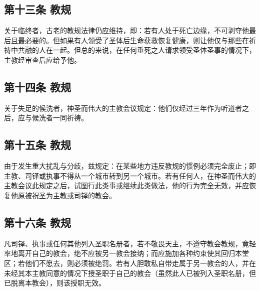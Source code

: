 
\subsection{第十三条 教规}

关于临终者，古老的教规法律仍应维持，即：若有人处于死亡边缘，不可剥夺他最后且最必要的。但如果有人领受了圣体后生命获救恢复健康，则让他仅与那些在祈祷中共融的人在一起。但总的来说，在任何垂死之人请求领受圣体圣事的情况下，主教经审查后应给予他。\par


\subsection{第十四条 教规}

关于失足的候洗者，神圣而伟大的主教会议规定：他们仅经过三年作为听道者之后，应与候洗者一同祈祷。\par


\subsection{第十五条 教规}

由于发生重大扰乱与分歧，兹规定：在某些地方违反教规的惯例必须完全废止；即主教、司铎或执事不得从一个城市转到另一个城市。若有任何人，在神圣而伟大的主教会议此规定之后，试图行此类事或继续此类做法，他的行为完全无效，并应恢复他原被祝圣为主教或司铎的教会。\par


\subsection{第十六条 教规}

凡司铎、执事或任何其他列入圣职名册者，若不敬畏天主，不遵守教会教规，竟轻率地离开自己的教会，绝不应被另一教会接纳；而应施加各种约束使其回归本堂区；若他们不愿去，则必须被绝罚。若有人胆敢私自带走属于另一教会的人，并在未经其本主教同意的情况下授圣职于自己的教会（虽然此人已被列入圣职名册，但已脱离本教会），则该授职无效。\par

